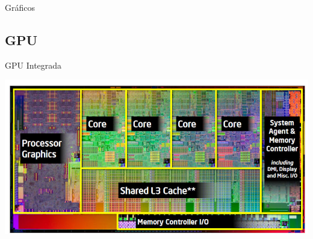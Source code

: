 \documentclass[10pt,xcolor={dvipsnames}]{beamer}
\begin{document}
\begin{frame}{Gráficos}
\begin{center}
\end{center}
\end{frame}

\subsection{GPU}
\begin{frame}{GPU Integrada}
\begin{center}
\includegraphics[scale=0.5]{Figures/ProcesadorInt}
\end{center}
\end{frame}
\end{document}
